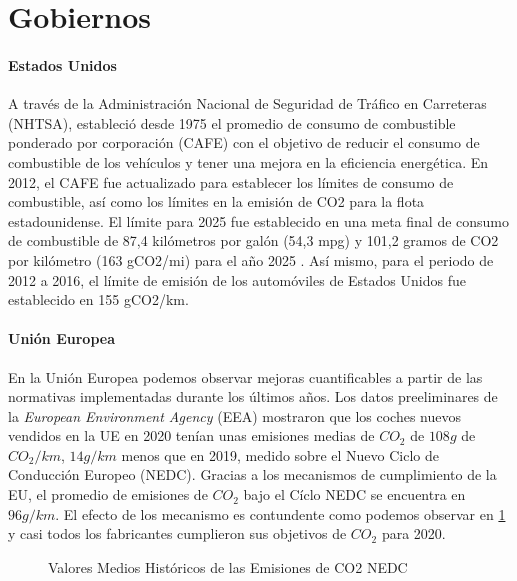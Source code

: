 \section{Gobiernos}


\paragraph{Estados Unidos} A través de la Administración Nacional de Seguridad de Tráfico en Carreteras (NHTSA), estableció desde 1975 el promedio de consumo de combustible ponderado por corporación (CAFE) con el objetivo de reducir el consumo de combustible de los vehículos y tener una mejora en la eficiencia energética. En 2012, el CAFE fue actualizado para establecer los límites de consumo de combustible, así como los límites en la emisión de CO2 para la flota estadounidense. El límite para 2025 fue establecido en una meta final de consumo de combustible de 87,4 kilómetros por galón (54,3 mpg) y 101,2 gramos de CO2 por kilómetro (163 gCO2/mi) para el año 2025 \cite{EPA_2012-B}. Así mismo, para el periodo de 2012 a 2016, el límite de emisión de los automóviles de Estados Unidos fue establecido en 155 gCO2/km.

\paragraph{Unión Europea}

En la Unión Europea podemos observar mejoras cuantificables a partir de las normativas implementadas durante los últimos años. Los datos preeliminares de la \textit{European Environment Agency} (EEA) mostraron que los coches nuevos vendidos en la UE en 2020 tenían unas emisiones medias de $CO_2$ de $108g$ de $CO_2/km$, $14g/km$ menos que en 2019, medido sobre el Nuevo Ciclo de Conducción Europeo (NEDC). \cite{ICCT_Performance_2020} Gracias a los mecanismos de cumplimiento de la EU, el promedio de emisiones de $CO_2$ bajo el Cíclo NEDC se encuentra en $96 g/km$. El efecto de los mecanismo es contundente como podemos observar en \ref{fig:iccp-performance} y casi todos los fabricantes cumplieron sus objetivos de $CO_2$ para 2020.

 \begin{figure}[htbp]
   \centering
   
    \caption{Valores Medios Históricos de las Emisiones de CO2 NEDC \cite{ICCT_Performance_2020}}
    \label{fig:iccp-performance}
\end{figure}

